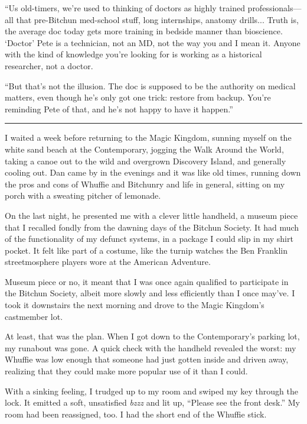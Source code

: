 “Us old-timers, we're used to thinking of doctors as highly trained
professionals—all that pre-Bitchun med-school stuff, long
internships, anatomy drills... Truth is, the average doc today gets
more training in bedside manner than bioscience. ‘Doctor’ Pete is a
technician, not an MD, not the way you and I mean it. Anyone with
the kind of knowledge you're looking for is working as a historical
researcher, not a doctor.

“But that's not the illusion. The doc is supposed to be the
authority on medical matters, even though he's only got one trick:
restore from backup. You're reminding Pete of that, and he's not
happy to have it happen.”

\begin{center}\rule{3in}{0.4pt}\end{center}

I waited a week before returning to the Magic Kingdom, sunning
myself on the white sand beach at the Contemporary, jogging the
Walk Around the World, taking a canoe out to the wild and overgrown
Discovery Island, and generally cooling out. Dan came by in the
evenings and it was like old times, running down the pros and cons
of Whuffie and Bitchunry and life in general, sitting on my porch
with a sweating pitcher of lemonade.

On the last night, he presented me with a clever little handheld, a
museum piece that I recalled fondly from the dawning days of the
Bitchun Society. It had much of the functionality of my defunct
systems, in a package I could slip in my shirt pocket. It felt like
part of a costume, like the turnip watches the Ben Franklin
streetmosphere players wore at the American Adventure.

Museum piece or no, it meant that I was once again qualified to
participate in the Bitchun Society, albeit more slowly and less
efficiently than I once may've. I took it downstairs the next
morning and drove to the Magic Kingdom's castmember lot.

At least, that was the plan. When I got down to the Contemporary's
parking lot, my runabout was gone. A quick check with the handheld
revealed the worst: my Whuffie was low enough that someone had just
gotten inside and driven away, realizing that they could make more
popular use of it than I could.

With a sinking feeling, I trudged up to my room and swiped my key
through the lock. It emitted a soft, unsatisfied \emph{bzzz} and
lit up, “Please see the front desk.” My room had been reassigned,
too. I had the short end of the Whuffie stick.

